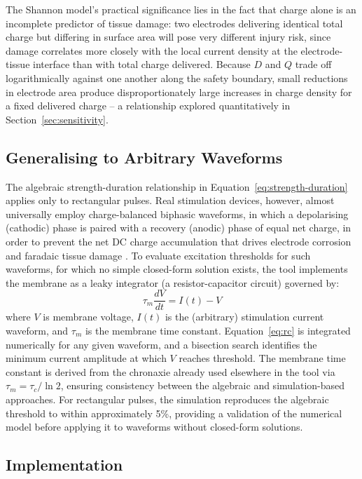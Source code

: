 \documentclass[conference]{IEEEtran}
\begin{document}
The Shannon model's practical significance lies in the fact that charge alone is an incomplete predictor of tissue damage: two electrodes delivering identical total charge but differing in surface area will pose very different injury risk, since damage correlates more closely with the local current density at the electrode-tissue interface than with total charge delivered. Because $D$ and $Q$ trade off logarithmically against one another along the safety boundary, small reductions in electrode area produce disproportionately large increases in charge density for a fixed delivered charge -- a relationship explored quantitatively in Section~\ref{sec:sensitivity}.

\subsection{Generalising to Arbitrary Waveforms}

The algebraic strength-duration relationship in Equation~\ref{eq:strength-duration} applies only to rectangular pulses. Real stimulation devices, however, almost universally employ charge-balanced biphasic waveforms, in which a depolarising (cathodic) phase is paired with a recovery (anodic) phase of equal net charge, in order to prevent the net DC charge accumulation that drives electrode corrosion and faradaic tissue damage \cite{merrill2005}. To evaluate excitation thresholds for such waveforms, for which no simple closed-form solution exists, the tool implements the membrane as a leaky integrator (a resistor-capacitor circuit) governed by:
\begin{equation}
\tau_m \frac{dV}{dt} = I(t) - V
\label{eq:rc}
\end{equation}
where $V$ is membrane voltage, $I(t)$ is the (arbitrary) stimulation current waveform, and $\tau_m$ is the membrane time constant. Equation~\ref{eq:rc} is integrated numerically for any given waveform, and a bisection search identifies the minimum current amplitude at which $V$ reaches threshold. The membrane time constant is derived from the chronaxie already used elsewhere in the tool via $\tau_m = \tau_c / \ln 2$, ensuring consistency between the algebraic and simulation-based approaches. For rectangular pulses, the simulation reproduces the algebraic threshold to within approximately 5\%, providing a validation of the numerical model before applying it to waveforms without closed-form solutions.

\subsection{Implementation}
\end{document}

